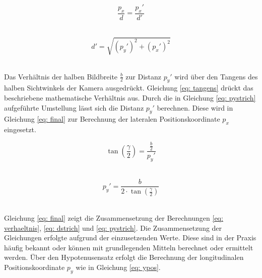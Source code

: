 		
		\begin{figure}[H]
			\centering
			\begin{minipage}[b]{0.49\textwidth}
				\begin{equation}
					\frac{p_x}{d}=\frac{{p_x}'}{d'}
					\label{eq: verhaeltnis}
				\end{equation}\\
			\end{minipage}
			\hfill
			\begin{minipage}[b]{0.49\textwidth}
				\begin{equation}
					d'=\sqrt{({p_y}')^2+({p_x}')^2}
					\label{eq: dstrich}
				\end{equation}\\
			\end{minipage}
		\end{figure}
		
		Das Verhältnis der halben Bildbreite $\frac{b}{2}$ zur Distanz ${p_y}'$ wird über den Tangens des halben Sichtwinkels der Kamera ausgedrückt. Gleichung \ref{eq: tangens} drückt das beschriebene mathematische Verhältnis aus. Durch die in Gleichung \ref{eq: pystrich} aufgeführte Umstellung lässt sich die Distanz ${p_y}'$ berechnen. Diese wird in Gleichung \ref{eq: final} zur Berechnung der lateralen Positionskoordinate $p_x$ eingesetzt.\\
		
		\begin{figure}[H]
			\centering
			\begin{minipage}[b]{0.49\textwidth}
				\begin{equation}
					\tan\left(\frac{\gamma}{2}\right)=\frac{\frac{b}{2}}{{p_y}'}
					\label{eq: tangens}
				\end{equation}\\
			\end{minipage}
			\hfill
			\begin{minipage}[b]{0.49\textwidth}
				\begin{equation}
					{p_y}'=\frac{b}{2\cdot \tan\left(\frac{\gamma}{2}\right)}
					\label{eq: pystrich}
				\end{equation}\\
			\end{minipage}
		\end{figure}
	
		Gleichung \ref{eq: final} zeigt die Zusammensetzung der Berechnungen \ref{eq: verhaeltnis}, \ref{eq: dstrich} und \ref{eq: pystrich}. Die Zusammensetzung der Gleichungen erfolgte aufgrund der einzusetzenden Werte. Diese sind in der Praxis häufig bekannt oder können mit grundlegenden Mitteln berechnet oder ermittelt werden. Über den Hypotenusensatz erfolgt die Berechnung der longitudinalen Positionskoordinate $p_y$ wie in Gleichung \ref{eq: ypos}.\\		
	
